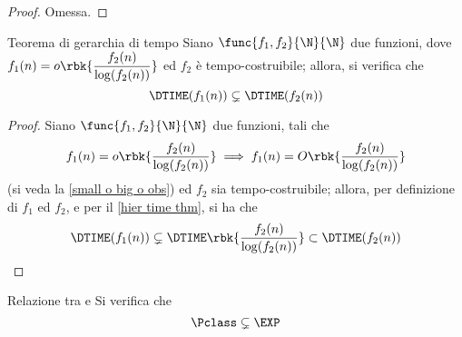 \documentclass[a4paper, 12pt]{report}
\begin{document}
    \begin{proof}
        Omessa.
    \end{proof}

    \begin{framedcor}[label={hier time thm cor}]{Teorema di gerarchia di tempo}
        Siano $\func{f_1, f_2}{\N}{\N}$ due funzioni, dove $f_1(n) = o\rbk{\dfrac{f_2(n)}{\log(f_2(n))}}$ ed $f_2$ è tempo-costruibile; allora, si verifica che $$\DTIME(f_1(n)) \subsetneq \DTIME(f_2(n))$$
    \end{framedcor}

    \begin{proof}
        Siano $\func{f_1, f_2}{\N}{\N}$ due funzioni, tali che $$f_1(n) = o\rbk{\dfrac{f_2(n)}{\log(f_2(n))}} \implies f_1(n) = O\rbk{\dfrac{f_2(n)}{\log(f_2(n))}}$$ (si veda la \cref{small o big o obs}) ed $f_2$ sia tempo-costruibile; allora, per definizione di $f_1$ ed $f_2$, e per il \cref{hier time thm}, si ha che $$\DTIME(f_1(n)) \subsetneq \DTIME\rbk{\dfrac{f_2(n)}{\log(f_2(n))}} \subset \DTIME (f_2(n))$$
    \end{proof}

    \begin{framedprop}{Relazione tra \Pclass e \EXP}
        Si verifica che $$\Pclass \subsetneq \EXP$$
    \end{framedprop}
\end{document}
